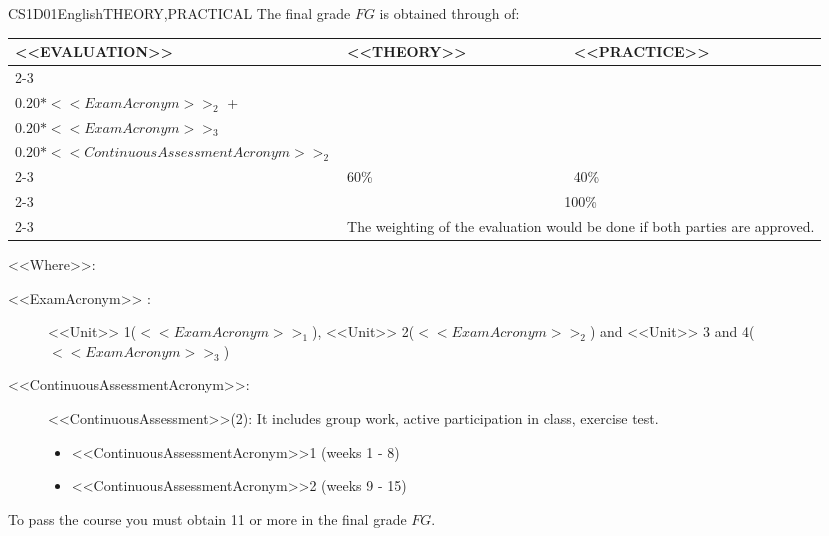   \begin{evaluation}{CS1D01}{English}{THEORY,PRACTICAL}
    The final grade $FG$ is obtained through of:

  \begin{tabularx}{0.9\textwidth}{|X|p{}|p{}|} \hline
    \multirow{4}{*}{\uppercase{<<Evaluation>>}} & \uppercase{<<Theory>>} & \uppercase{<<Practice>>} \\ \cline{2-3}
    & %
        \begin{minipage}{0.95\textwidth}
        \begin{tabular}{l}
            $0.20*<<ExamAcronym>>_{1}$  + \\
            $0.20*<<ExamAcronym>>_{2}$  + \\
            $0.20*<<ExamAcronym>>_{3}$  
            \end{tabular} 
        \end{minipage} 
    & %
        \begin{minipage}{0.95\textwidth}
        \begin{tabular}{l}
            $0.20*<<ContinuousAssessmentAcronym>>_{1}$ + \\
            $0.20*<<ContinuousAssessmentAcronym>>_{2}$ 
        \end{tabular} 
        \end{minipage}                 \\ \cline{2-3}
  
    & %
    60\% 
    & %
    40\% \\ \cline{2-3}
    & \multicolumn{2}{|c|}{100\%}  \\ \cline{2-3}
    & \multicolumn{2}{|c|}{The weighting of the evaluation would be done if both parties are approved.}  \\ \hline
    \end{tabularx}
        
    \vspace{2mm}
    \noindent <<Where>>:
    \begin{description}
        \item[<<ExamAcronym>> :] <<Unit>> 1($<<ExamAcronym>>_{1}$), <<Unit>> 2($<<ExamAcronym>>_{2}$) and <<Unit>> 3 and 4($<<ExamAcronym>>_{3}$) 
        \item[<<ContinuousAssessmentAcronym>>:]<<ContinuousAssessment>>(2): It includes group work, active participation in class, exercise test.
        \begin{itemize}
              \item <<ContinuousAssessmentAcronym>>1 (weeks 1 - 8) 
              \item <<ContinuousAssessmentAcronym>>2 (weeks 9 - 15)
        \end{itemize}
    \end{description}
  \noindent To pass the course you must obtain 11 or more in the final grade $FG$.
  \end{evaluation}
 
